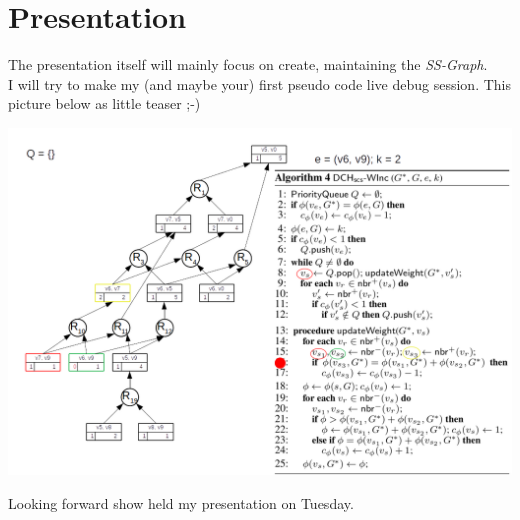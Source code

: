 \documentclass[twocolumn]{article}
\begin{document}
\section*{Presentation}

The presentation itself will mainly focus on create, maintaining the \textit{SS-Graph}.
\\
I will try to make my (and maybe your) first pseudo code live debug session.
This picture below as little teaser ;-)

\includegraphics*[scale=0.21]{assets/drawings/retracingWeightIncSsGraph.png}

Looking forward show held my presentation on Tuesday.


\newpage


\end{document}
